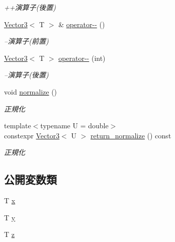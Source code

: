 \begin{DoxyCompactItemize}
\begin{DoxyCompactList}\small\item\em ++演算子(後置) \end{DoxyCompactList}\item 
\mbox{\hyperlink{classsaki_1_1_vector3}{Vector3}}$<$ T $>$ \& \mbox{\hyperlink{classsaki_1_1_vector3_a0811320313e336ec3182422ca4c726f6}{operator-\/-\/}} ()
\begin{DoxyCompactList}\small\item\em --演算子(前置) \end{DoxyCompactList}\item 
\mbox{\hyperlink{classsaki_1_1_vector3}{Vector3}}$<$ T $>$ \mbox{\hyperlink{classsaki_1_1_vector3_a4d1ff848a3a4bcce6c7911e2f7ac3d7d}{operator-\/-\/}} (int)
\begin{DoxyCompactList}\small\item\em --演算子(後置) \end{DoxyCompactList}\item 
void \mbox{\hyperlink{classsaki_1_1_vector3_a7b9496274bab6ea6147e6a09e1493110}{normalize}} ()
\begin{DoxyCompactList}\small\item\em 正規化 \end{DoxyCompactList}\item 
{\footnotesize template$<$typename U  = double$>$ }\\constexpr \mbox{\hyperlink{classsaki_1_1_vector3}{Vector3}}$<$ U $>$ \mbox{\hyperlink{classsaki_1_1_vector3_aba9ad0892e1219ced218a194afa18d14}{return\+\_\+normalize}} () const
\begin{DoxyCompactList}\small\item\em 正規化 \end{DoxyCompactList}\end{DoxyCompactItemize}
\subsection*{公開変数類}
\begin{DoxyCompactItemize}
\item 
T \mbox{\hyperlink{classsaki_1_1_vector3_a1fa58e9e75dbeb650afb3db740f3131c}{x}}
\item 
T \mbox{\hyperlink{classsaki_1_1_vector3_aba41be4543769bd023387691acf654dd}{y}}
\item 
T \mbox{\hyperlink{classsaki_1_1_vector3_abb4ddf92f66d05e965fbd17ab3e655ff}{z}}
\end{DoxyCompactItemize}


